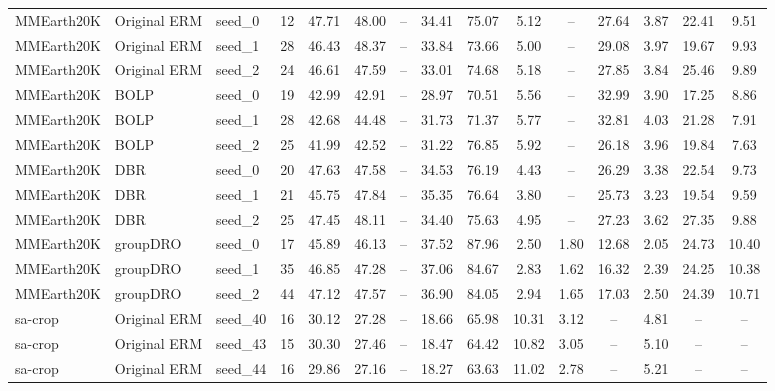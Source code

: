 \documentclass[11pt]{article}
\begin{document}
\begin{table}[h!]
{\begin{tabular}{lllcccccccccccc}
\midrule

MMEarth20K & Original ERM & seed\_0 & 12 & 47.71 & 48.00 & -- & 34.41 & 75.07 & 5.12 & -- & 27.64 & 3.87 & 22.41 & 9.51 \\
MMEarth20K & Original ERM & seed\_1 & 28 & 46.43 & 48.37 & -- & 33.84 & 73.66 & 5.00 & -- & 29.08 & 3.97 & 19.67 & 9.93 \\
MMEarth20K & Original ERM & seed\_2 & 24 & 46.61 & 47.59 & -- & 33.01 & 74.68 & 5.18 & -- & 27.85 & 3.84 & 25.46 & 9.89 \\

MMEarth20K & BOLP & seed\_0 & 19 & 42.99 & 42.91 & -- & 28.97 & 70.51 & 5.56 & -- & 32.99 & 3.90 & 17.25 & 8.86 \\
MMEarth20K & BOLP & seed\_1 & 28 & 42.68 & 44.48 & -- & 31.73 & 71.37 & 5.77 & -- & 32.81 & 4.03 & 21.28 & 7.91 \\
MMEarth20K & BOLP & seed\_2 & 25 & 41.99 & 42.52 & -- & 31.22 & 76.85 & 5.92 & -- & 26.18 & 3.96 & 19.84 & 7.63 \\

MMEarth20K & DBR & seed\_0 & 20 & 47.63 & 47.58 & -- & 34.53 & 76.19 & 4.43 & -- & 26.29 & 3.38 & 22.54 & 9.73 \\
MMEarth20K & DBR & seed\_1 & 21 & 45.75 & 47.84 & -- & 35.35 & 76.64 & 3.80 & -- & 25.73 & 3.23 & 19.54 & 9.59 \\
MMEarth20K & DBR & seed\_2 & 25 & 47.45 & 48.11 & -- & 34.40 & 75.63 & 4.95 & -- & 27.23 & 3.62 & 27.35 & 9.88 \\
MMEarth20K & groupDRO & seed\_0 & 17 & 45.89 & 46.13 & -- & 37.52 & 87.96 & 2.50 & 1.80 & 12.68 & 2.05 & 24.73 & 10.40 \\
MMEarth20K & groupDRO & seed\_1 & 35 & 46.85 & 47.28 & -- & 37.06 & 84.67 & 2.83 & 1.62 & 16.32 & 2.39 & 24.25 & 10.38 \\
MMEarth20K & groupDRO & seed\_2 & 44 & 47.12 & 47.57 & -- & 36.90 & 84.05 & 2.94 & 1.65 & 17.03 & 2.50 & 24.39 & 10.71 \\

\midrule

sa-crop & Original ERM & seed\_40 & 16 & 30.12 & 27.28 & -- & 18.66 & 65.98 & 10.31 & 3.12 & -- & 4.81 & -- & -- \\
sa-crop & Original ERM & seed\_43 & 15 & 30.30 & 27.46 & -- & 18.47 & 64.42 & 10.82 & 3.05 & -- & 5.10 & -- & -- \\
sa-crop & Original ERM & seed\_44 & 16 & 29.86 & 27.16 & -- & 18.27 & 63.63 & 11.02 & 2.78 & -- & 5.21 & -- & -- \\


\end{tabular}}
\end{table}
\end{document}
